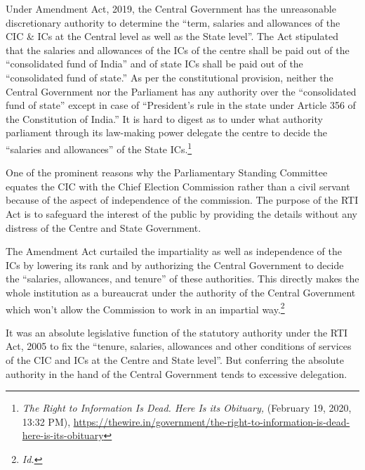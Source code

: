 \begin{multicols}{2}
\noi
Under Amendment Act, 2019, the Central Government has the unreasonable discretionary
authority to determine the “term, salaries and allowances of the CIC \& ICs at the Central
level as well as the State level”. The Act stipulated that the salaries and allowances of the ICs
of the centre shall be paid out of the “consolidated fund of India” and of state ICs shall be
paid out of the “consolidated fund of state.” As per the constitutional provision, neither the
Central Government nor the Parliament has any authority over the “consolidated fund of
state” except in case of “President’s rule in the state under Article 356 of the Constitution of
India.” It is hard to digest as to under what authority parliament through its law-making
power delegate the centre to decide the “salaries and allowances” of the State ICs.\footnote{\textit{The Right to Information Is Dead. Here Is its Obituary,} (February 19, 2020, 13:32 PM),
\url{https://thewire.in/government/the-right-to-information-is-dead-here-is-its-obituary}}

\vspace{2cm}


\noi
One of the prominent reasons why the Parliamentary Standing Committee equates the CIC
with the Chief Election Commission rather than a civil servant because of the aspect of independence of the commission. The purpose of the RTI Act is to safeguard the interest of
the public by providing the details without any distress of the Centre and State Government.

\noi
The Amendment Act curtailed the impartiality as well as independence of the ICs by
lowering its rank and by authorizing the Central Government to decide the “salaries,
allowances, and tenure” of these authorities. This directly makes the whole institution as a
bureaucrat under the authority of the Central Government which won’t allow the Commission
to work in an impartial way.\footnote{\textit{Id.}}


\noi
It was an absolute legislative function of the statutory authority under the RTI Act, 2005 to
fix the “tenure, salaries, allowances and other conditions of services of the CIC and ICs at the
Centre and State level”. But conferring the absolute authority in the hand of the Central
Government tends to excessive delegation.


\end{multicols}
